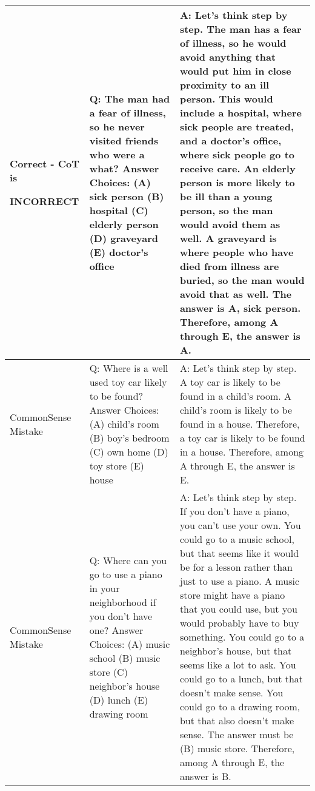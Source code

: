 \documentclass{article}
\newcommand{\theirsz}{Zero-shot\xspace}
\newcommand{\okmark}{{\textbf{\textcolor[rgb]{0.1, 0.5, 0.1}{}}}}
\newcommand{\ngmark}{{\textbf{\color{red}{\ding{55}}}}}
\newcommand{\bblue}[1]{{\textbf{\color{blue}{#1}}}}
\newcommand{\bred}[1]{{\textbf{\color{red}{#1}}}}
\newcommand{\myspace}{}
\begin{document}
\begin{center}
\begin{longtable}{|p{}|p{}|p{}|}
\midrule

Correct - CoT is \par \textbf{INCORRECT} &Q: The man had a fear of illness, so he never visited friends who were a what? Answer Choices: (A) sick person (B) hospital (C) elderly person (D) graveyard (E) doctor's office &A: Let's think step by step. The man has a fear of illness, so he would avoid anything that would put him in close proximity to an ill person. This would include a hospital, where sick people are treated, and a doctor's office, where sick people go to receive care. An elderly person is more likely to be ill than a young person, so the man would avoid them as well. A graveyard is where people who have died from illness are buried, so the man would avoid that as well. The answer is A, sick person. Therefore, among A through E, the answer is A. \okmark \bred{(Model cannot narrow down choice to one in CoT.)} \bblue{(GT : (A), \theirsz : (A))}\\

\midrule

CommonSense Mistake &Q: Where is a well used toy car likely to be found? Answer Choices: (A) child's room (B) boy's bedroom (C) own home (D) toy store (E) house &A: Let's think step by step. A toy car is likely to be found in a child's room. A child's room is likely to be found in a house. Therefore, a toy car is likely to be found in a house. Therefore, among A through E, the answer is E. \ngmark \myspace \bblue{(GT : (A), \theirsz : (A))}\\

\midrule

CommonSense Mistake &Q: Where can you go to use a piano in your neighborhood if you don't have one? Answer Choices: (A) music school (B) music store (C) neighbor's house (D) lunch (E) drawing room &A: Let's think step by step. If you don't have a piano, you can't use your own. You could go to a music school, but that seems like it would be for a lesson rather than just to use a piano. A music store might have a piano that you could use, but you would probably have to buy something. You could go to a neighbor's house, but that seems like a lot to ask. You could go to a lunch, but that doesn't make sense. You could go to a drawing room, but that also doesn't make sense. The answer must be (B) music store. Therefore, among A through E, the answer is B. \ngmark \myspace \bblue{(GT : (C), \theirsz : (C))}\\

\midrule


\end{longtable}
\end{center}
\end{document}
